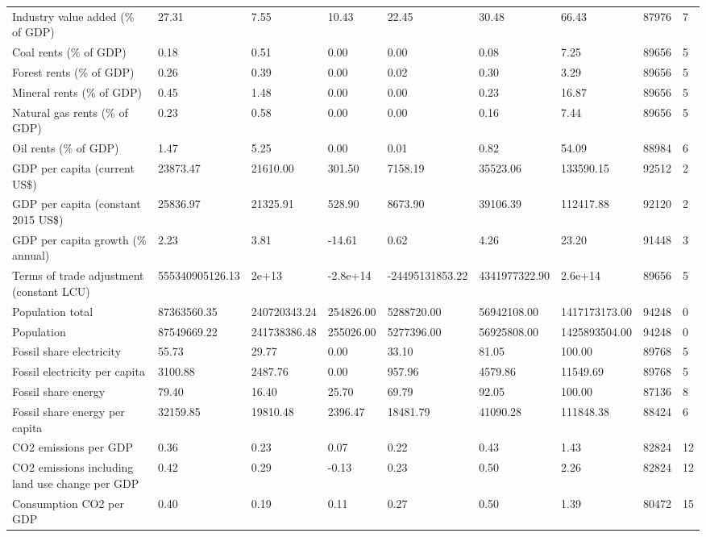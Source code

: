 \begin{longtable}{lllllllll}
Industry value added (\% of GDP) & 27.31 & 7.55 & 10.43 & 22.45 & 30.48 & 66.43 & 87976 & 7\\
Coal rents (\% of GDP) & 0.18 & 0.51 & 0.00 & 0.00 & 0.08 & 7.25 & 89656 & 5\\
Forest rents (\% of GDP) & 0.26 & 0.39 & 0.00 & 0.02 & 0.30 & 3.29 & 89656 & 5\\
Mineral rents (\% of GDP) & 0.45 & 1.48 & 0.00 & 0.00 & 0.23 & 16.87 & 89656 & 5\\
\addlinespace
Natural gas rents (\% of GDP) & 0.23 & 0.58 & 0.00 & 0.00 & 0.16 & 7.44 & 89656 & 5\\
Oil rents (\% of GDP) & 1.47 & 5.25 & 0.00 & 0.01 & 0.82 & 54.09 & 88984 & 6\\
GDP per capita (current US\$) & 23873.47 & 21610.00 & 301.50 & 7158.19 & 35523.06 & 133590.15 & 92512 & 2\\
GDP per capita (constant 2015 US\$) & 25836.97 & 21325.91 & 528.90 & 8673.90 & 39106.39 & 112417.88 & 92120 & 2\\
GDP per capita growth (\% annual) & 2.23 & 3.81 & -14.61 & 0.62 & 4.26 & 23.20 & 91448 & 3\\
\addlinespace
Terms of trade adjustment (constant LCU) & 555340905126.13 & 2e+13 & -2.8e+14 & -24495131853.22 & 4341977322.90 & 2.6e+14 & 89656 & 5\\
Population total & 87363560.35 & 240720343.24 & 254826.00 & 5288720.00 & 56942108.00 & 1417173173.00 & 94248 & 0\\
Population & 87549669.22 & 241738386.48 & 255026.00 & 5277396.00 & 56925808.00 & 1425893504.00 & 94248 & 0\\
Fossil share electricity & 55.73 & 29.77 & 0.00 & 33.10 & 81.05 & 100.00 & 89768 & 5\\
Fossil electricity per capita & 3100.88 & 2487.76 & 0.00 & 957.96 & 4579.86 & 11549.69 & 89768 & 5\\
\addlinespace
Fossil share energy & 79.40 & 16.40 & 25.70 & 69.79 & 92.05 & 100.00 & 87136 & 8\\
Fossil share energy per capita & 32159.85 & 19810.48 & 2396.47 & 18481.79 & 41090.28 & 111848.38 & 88424 & 6\\
CO2 emissions per GDP & 0.36 & 0.23 & 0.07 & 0.22 & 0.43 & 1.43 & 82824 & 12\\
CO2 emissions including land use change per GDP & 0.42 & 0.29 & -0.13 & 0.23 & 0.50 & 2.26 & 82824 & 12\\
Consumption CO2 per GDP & 0.40 & 0.19 & 0.11 & 0.27 & 0.50 & 1.39 & 80472 & 15\\

\end{longtable}
